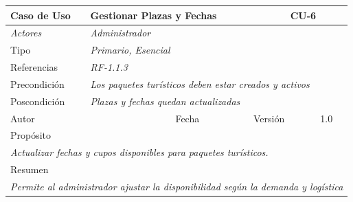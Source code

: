 \begin{table}[H]
\begin{tabular}{|llllllll|}
\hline
\multicolumn{1}{|l|}{\cellcolor[HTML]{F2F2F2}Caso de Uso} & \multicolumn{5}{l|}{Gestionar Plazas y Fechas} & \multicolumn{2}{l|}{\cellcolor[HTML]{E6E6E6}CU-6} \\ \hline
\multicolumn{1}{|l|}{{\color[HTML]{808080} \textit{Actores}}} & \multicolumn{7}{l|}{{\color[HTML]{808080} \textit{Administrador}}} \\ \hline
\multicolumn{1}{|l|}{Tipo} & \multicolumn{7}{l|}{{\color[HTML]{808080} \textit{Primario, Esencial}}} \\ \hline
\multicolumn{1}{|l|}{Referencias} & \multicolumn{2}{l|}{{\color[HTML]{808080} \textit{RF-1.1.3}}} & \multicolumn{5}{l|}{} \\ \hline
\multicolumn{1}{|l|}{Precondición} & \multicolumn{7}{l|}{{\color[HTML]{808080} \textit{Los paquetes turísticos deben estar creados y activos}}} \\ \hline
\multicolumn{1}{|l|}{Poscondición} & \multicolumn{7}{l|}{{\color[HTML]{808080} \textit{Plazas y fechas quedan actualizadas}}} \\ \hline
\multicolumn{1}{|l|}{Autor} & \multicolumn{1}{l|}{} & \multicolumn{2}{l|}{Fecha} & \multicolumn{1}{l|}{} & \multicolumn{2}{l|}{Versión} & 1.0 \\ \hline
\multicolumn{8}{|l|}{Propósito} \\ \hline
\multicolumn{8}{|p{15cm}|}{{\color[HTML]{808080} \textit{Actualizar fechas y cupos disponibles para paquetes turísticos.}}} \\ \hline
\multicolumn{8}{|l|}{Resumen} \\ \hline
\multicolumn{8}{|p{15cm}|}{{\color[HTML]{808080} \textit{Permite al administrador ajustar la disponibilidad según la demanda y logística}}} \\ \hline
\end{tabular}
\end{table}

